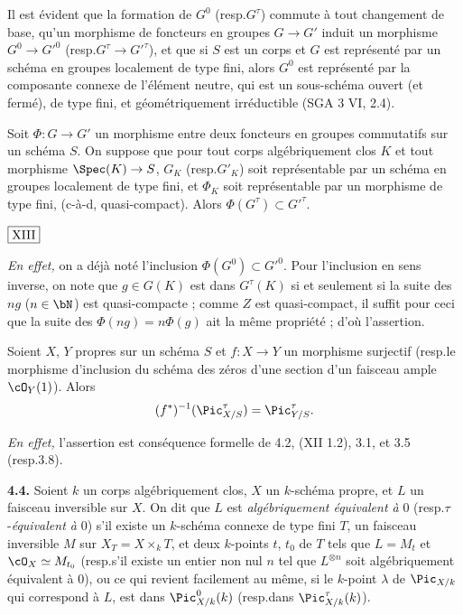 Il est évident que la formation de $G^0$ (resp.\@ $G^{\tau}$) commute à tout changement de base, qu'un morphisme de foncteurs en groupes $G \to G'$ induit un morphisme $G^0 \to G'^0$ (resp.\@ $G^{\tau} \to G'^{\tau}$), et que si $S$ est un corps et $G$ est représenté par un schéma en groupes localement de type fini, alors $G^0$ est représenté par la composante connexe de l'élément neutre, qui est un sous-schéma ouvert (et fermé), de type fini, et géométriquement irréductible (SGA 3 VI, 2.4).

\begin{lem}\label{lem:4.2} Soit $\Phi : G \to G'$ un morphisme entre deux foncteurs en groupes commutatifs sur un schéma $S$. On suppose que pour tout corps algébriquement clos $K$ et tout morphisme $\Spec(K) \to S$, $G_K$ (resp.\@ $G'_K$) soit représentable par un schéma en groupes localement de type fini, et $\Phi_K$ soit représentable par un morphisme de type fini, (c-à-d, quasi-compact). Alors $\Phi(G^{\tau}) \subset G'^{\tau}$.
\end{lem}

\begin{flushright}
$\fbox{\text{XIII}}$
\end{flushright}

\noindent\textit{En effet,} on a déjà noté l'inclusion $\Phi(G^0) \subset G'^0$. Pour l'inclusion en sens inverse, on note que $g \in G(K)$ est dans $G^{\tau}(K)$ si et seulement si la suite des $ng$ ($n \in \bN$) est quasi-compacte ; comme $Z$ est quasi-compact, il suffit pour ceci que la suite des $\Phi(ng) = n\Phi(g)$ ait la même propriété ; d'où l'assertion.

\begin{lem}\label{lem:4.3} Soient $X$, $Y$ propres sur un schéma $S$ et $f : X \to Y$ un morphisme surjectif (resp.\@ le morphisme d'inclusion du schéma des zéros d'une section d'un faisceau ample $\cO_Y(1)$). Alors
\[
(f^*)^{-1}(\Pic^{\tau}_{X/S}) = \Pic^{\tau}_{Y/S}.
\]
\end{lem}

\noindent\textit{En effet,} l'assertion est conséquence formelle de 4.2, (XII 1.2), 3.1, et 3.5 (resp.\@ 3.8).

\smallskip
\noindent\textbf{4.4.} Soient $k$ un corps algébriquement clos, $X$ un $k$-schéma propre, et $L$ un faisceau inversible sur $X$. On dit que $L$ est \emph{algébriquement équivalent à} $0$ (resp.\@ $\tau$-\emph{équivalent à} $0$) s'il existe un $k$-schéma connexe de type fini $T$, un faisceau inversible $M$ sur $X_T = X \times_k T$, et deux $k$-points $t$, $t_0$ de $T$ tels que $L = M_t$ et $\cO_X \simeq M_{t_0}$ (resp.\@ s'il existe un entier non nul $n$ tel que $L^{\otimes n}$ soit algébriquement équivalent à $0$), ou ce qui revient facilement au même, si le $k$-point $\lambda$ de $\Pic_{X/k}$ qui correspond à $L$, est dans $\Pic^0_{X/k}(k)$ (resp.\@ dans $\Pic^{\tau}_{X/k}(k)$).

